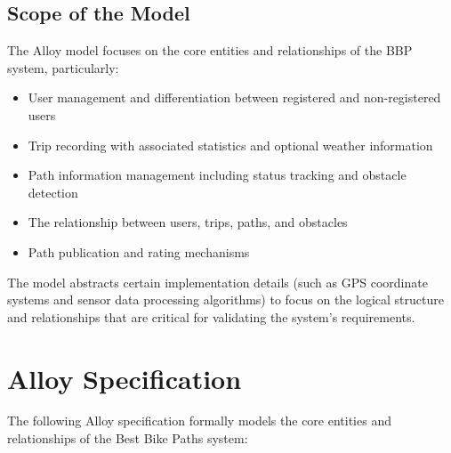 \subsection{Scope of the Model}
\label{subsec:scope_of_model}%

The Alloy model focuses on the core entities and relationships of the BBP system, particularly:

\begin{itemize}
    \item User management and differentiation between registered and non-registered users
    \item Trip recording with associated statistics and optional weather information
    \item Path information management including status tracking and obstacle detection
    \item The relationship between users, trips, paths, and obstacles
    \item Path publication and rating mechanisms
\end{itemize}

The model abstracts certain implementation details (such as GPS coordinate systems and sensor data processing algorithms) to focus on the logical structure and relationships that are critical for validating the system's requirements.

\newpage

\section{Alloy Specification}
\label{sec:alloy_specification}%

The following Alloy specification formally models the core entities and relationships of the Best Bike Paths system:

